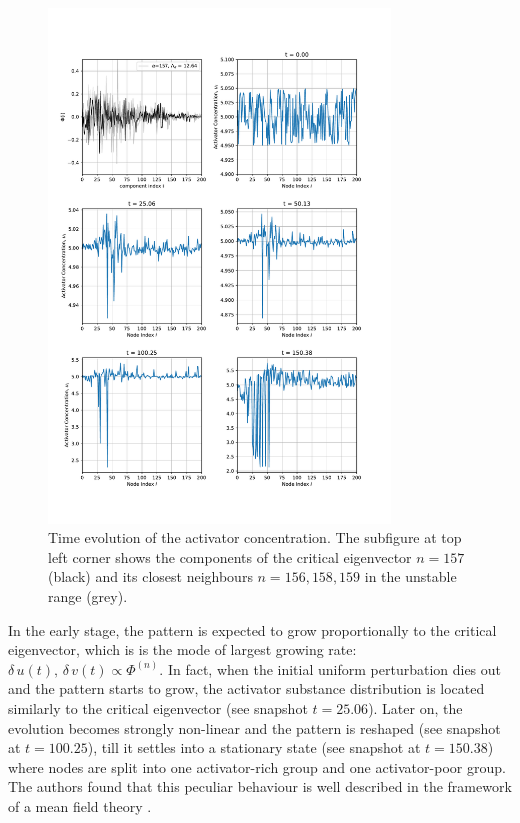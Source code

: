 \begin{figure}[H]
    \centering
    \includegraphics[width = 0.81\textwidth]{latex_source/images/turing/snapshots.pdf}
    \caption{ Time evolution of the activator concentration. The subfigure at top left corner shows the components of the critical eigenvector $n=157$ (black) and its closest neighbours $n=156, 158, 159$ in the unstable range (grey).}
    \label{fig:snapshots}
\end{figure}
\noindent In the early stage, the pattern is expected to grow proportionally to the critical eigenvector, which is is the mode of largest growing rate: $\delta\,u(t),\, \delta\,v(t) \propto \Phi^{(n)}$.
In fact, when the initial uniform perturbation dies out and the pattern starts to grow, the activator substance distribution is located similarly to the critical eigenvector (see snapshot $t = 25.06$). Later on, the evolution becomes strongly non-linear and the pattern is reshaped (see snapshot at $t = 100.25$), till it settles into a stationary state (see snapshot at $t = 150.38$) where nodes are split into one activator-rich group and one activator-poor group. The authors found that this peculiar behaviour is well described in the framework of a mean field theory \cite{main_network}. \medskip \newline \noindent
